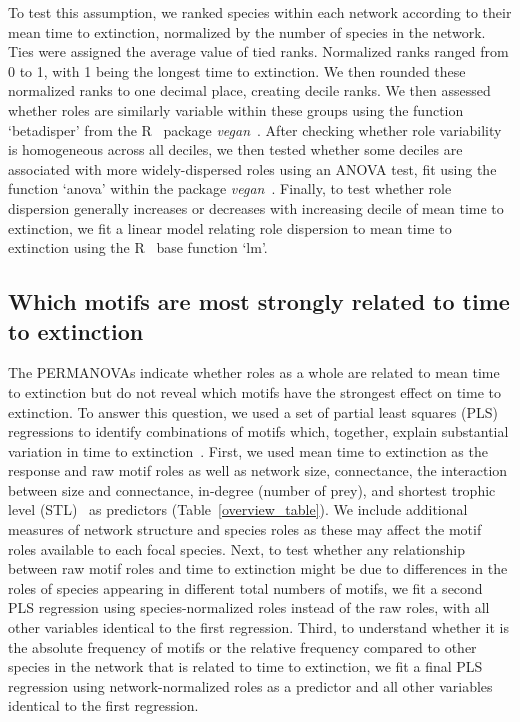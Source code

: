 \documentclass[12pt]{article}
\begin{document}
\begin{spacing}{2.0}
                To test this assumption, we ranked species within each network according to their mean time to extinction, normalized by the number of species in the network.
                Ties were assigned the average value of tied ranks.
                Normalized ranks ranged from 0 to 1, with 1 being the longest time to extinction.
                We then rounded these normalized ranks to one decimal place, creating decile ranks. 
                We then assessed whether roles are similarly variable within these groups using the function `betadisper' from the R~\citep{R} package \emph{vegan}~\citep{vegan}.
                After checking whether role variability is homogeneous across all deciles, we then tested whether some deciles are associated with more widely-dispersed roles using an ANOVA test, fit using the function `anova' within the package \emph{vegan}~\citep{vegan}.
                Finally, to test whether role dispersion generally increases or decreases with increasing decile of mean time to extinction, we fit a linear model relating role dispersion to mean time to extinction using the R~\citep{R} base function `lm'.

            

		\subsection*{Which motifs are most strongly related to time to extinction}

			The PERMANOVAs indicate whether roles as a whole are related to mean time to extinction but do not reveal which motifs have the strongest effect on time to extinction.
			To answer this question, we used a set of partial least squares (PLS) regressions to identify combinations of motifs which, together, explain substantial variation in time to extinction~\citep{Mevik2004,pls}.
			First, we used mean time to extinction as the response and raw motif roles as well as network size, connectance, the interaction between size and connectance, in-degree (number of prey), and shortest trophic level (STL)~\citep{Hairston1993} as predictors (Table~\ref{overview_table}).
			We include additional measures of network structure and species roles as these may affect the motif roles available to each focal species.
			Next, to test whether any relationship between raw motif roles and time to extinction might be due to differences in the roles of species appearing in different total numbers of motifs, we fit a second PLS regression using species-normalized roles instead of the raw roles, with all other variables identical to the first regression.
			Third, to understand whether it is the absolute frequency of motifs or the relative frequency compared to other species in the network that is related to time to extinction, we fit a final PLS regression using network-normalized roles as a predictor and all other variables identical to the first regression.
			


\end{spacing}
\end{document}
